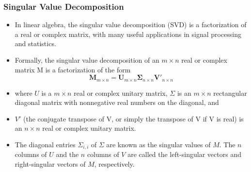 \documentclass[10pt]{beamer}
\begin{document}
\begin{frame}
  \frametitle{Singular Value Decomposition}

  \begin{itemize}
  \item In linear algebra, the singular value decomposition (SVD) is a
    factorization of a real or complex matrix, with many useful
    applications in signal processing and statistics.

  \item Formally, the singular value decomposition of an $m\times n$ real or
    complex matrix M is a factorization of the form
    \begin{equation*}
    \mathbf{M}_{m\times n} = \mathbf{U}_{m \times n}
    \boldsymbol{\Sigma}_{n\times n} \mathbf{V}'_{n\times n}
  \end{equation*}

\item   where $U$ is a $m\times n$ real or complex unitary matrix, $\Sigma$
  is an $m\times n$ rectangular diagonal matrix with nonnegative real
  numbers on the diagonal, and

\item $V'$ (the conjugate transpose of V, or
  simply the transpose of V if V is real) is an $n\times n$ real or
  complex unitary matrix.

\item The diagonal entries $\Sigma_{i,i}$ of
  $\Sigma$ are known as the singular values of $M$. The $n$ columns of
  $U$ and the $n$ columns of $V$ are called the left-singular vectors
  and right-singular vectors of $M$, respectively.
  \end{itemize}

\end{frame}
\end{document}
